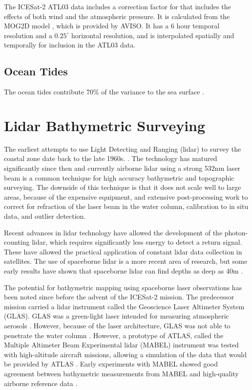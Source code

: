 The ICESat-2 ATL03 data includes a correction factor for that includes the effects of both wind and the atmospheric pressure. It is calculated from the MOG2D model \parencite{LeProvost1994}, which is provided by AVISO. It has a 6 hour temporal resolution and a $0.25^{\circ}$ horizontal resolution, and is interpolated spatially and temporally for inclusion in the ATL03 data.

\subsection{Ocean Tides}



The ocean tides contribute 70\% of the variance to the sea surface \parencite{icesat2 comparison guide}.


\section{Lidar Bathymetric Surveying}

The earliest attempts to use Light Detecting and Ranging (lidar) to survey the coastal zone date back to the late 1960s. \parencite{Bailly2016}. The technology has matured significantly since then and currently airborne lidar using a strong 532nm laser beam is a common technique for high accuracy bathymetric and topographic surveying. The downside of this technique is that it does not scale well to large areas, because of the expensive equipment, and extensive post-processing work to correct for refraction of the laser beam in the water column, calibration to in situ data, and outlier detection.

Recent advances in lidar technology have allowed the development of the photon-counting lidar, which requires significantly less energy to detect a return signal. These have allowed the practical application of constant lidar data collection in satellites. The use of spaceborne lidar is a more recent area of research, but some early results have shown that spaceborne lidar can find depths as deep as 40m \parencite{Parrish2019}.

The potential for bathymetric mapping using spaceborne laser observations has been noted since before the advent of the ICESat-2 mission. The predecessor mission carried a lidar instrument called the Geoscience Laser Altimeter System (GLAS). GLAS was a green-light laser intended for measuring atmospheric aerosols \parencite{Abshire2005}. However, because of the laser architecture, GLAS was not able to penetrate the water column \parencite{Forfinski-Sarkozi2016}. However, a prototype of ATLAS, called the Multiple Altimeter Beam Experimental lidar (MABEL) instrument was tested with high-altitude aircraft missions, allowing a simulation of the data that would be provided by ATLAS \parencite{Mcgill2013}. Early experiments with MABEL showed good agreement between bathymetric measurements from MABEL and high-quality airborne reference data \parencite{Jasinski2016,Forfinski-Sarkozi2016}.


